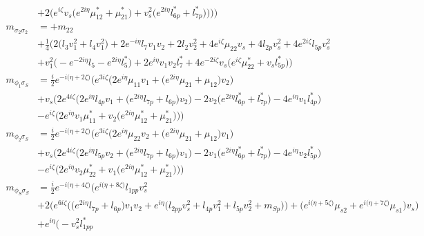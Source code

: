 \begin{itemize}
\begin{align}
 &+2 \Big(e^{i \zeta } v_s \Big(e^{2 i \eta } \mu_{12}^*  + \mu_{21}^*\Big) + v_{s}^{2} \Big(e^{2 i \eta } l_{6p}^*  + l_{7p}^*\Big)\Big)\Big)\Big)\\ 
m_{\sigma_2\sigma_2} &= +m_{22}\nonumber \\ 
 &+\frac{1}{4} \Big(2 \Big(l_3 v_{1}^{2}  + l_4 v_{1}^{2} \Big)+2 e^{-i \eta } l_7 v_1 v_2 +2 l_2 v_{2}^{2} +4 e^{i \zeta } \mu_{22} v_s +4 l_{2p} v_{s}^{2} +4 e^{2 i \zeta } l_{5p} v_{s}^{2} \nonumber \\ 
 &+v_{1}^{2} \Big(- e^{-2 i \eta } l_5  - e^{2 i \eta } l_5^* \Big)+2 e^{i \eta } v_1 v_2 l_7^* +4 e^{-2 i \zeta } v_s \Big(e^{i \zeta } \mu_{22}^*  + v_s l_{5p}^* \Big)\Big)\\ 
m_{\phi_1\sigma_S} &= \frac{i}{2} e^{-i \Big(\eta +2 \zeta \Big)} \Big(e^{3 i \zeta } \Big(2 e^{i \eta } \mu_{11} v_1  + \Big(e^{2 i \eta } \mu_{21}  + \mu_{12}\Big)v_2 \Big)\nonumber \\ 
 &+v_s \Big(2 e^{4 i \zeta } \Big(2 e^{i \eta } l_{4p} v_1  + \Big(e^{2 i \eta } l_{7p}  + l_{6p}\Big)v_2 \Big) -2 v_2 \Big(e^{2 i \eta } l_{6p}^*  + l_{7p}^*\Big) -4 e^{i \eta } v_1 l_{4p}^* \Big)\nonumber \\ 
 &- e^{i \zeta } \Big(2 e^{i \eta } v_1 \mu_{11}^*  + v_2 \Big(e^{2 i \eta } \mu_{12}^*  + \mu_{21}^*\Big)\Big)\Big)\\ 
m_{\phi_2\sigma_S} &= \frac{i}{2} e^{-i \Big(\eta +2 \zeta \Big)} \Big(e^{3 i \zeta } \Big(2 e^{i \eta } \mu_{22} v_2  + \Big(e^{2 i \eta } \mu_{21}  + \mu_{12}\Big)v_1 \Big)\nonumber \\ 
 &+v_s \Big(2 e^{4 i \zeta } \Big(2 e^{i \eta } l_{5p} v_2  + \Big(e^{2 i \eta } l_{7p}  + l_{6p}\Big)v_1 \Big) -2 v_1 \Big(e^{2 i \eta } l_{6p}^*  + l_{7p}^*\Big) -4 e^{i \eta } v_2 l_{5p}^* \Big)\nonumber \\ 
 &- e^{i \zeta } \Big(2 e^{i \eta } v_2 \mu_{22}^*  + v_1 \Big(e^{2 i \eta } \mu_{12}^*  + \mu_{21}^*\Big)\Big)\Big)\\ 
m_{\phi_S\sigma_S} &= \frac{i}{2} e^{-i \Big(\eta +4 \zeta \Big)} \Big(e^{i \Big(\eta +8 \zeta \Big)} l_{1pp} v_{s}^{2} \nonumber \\ 
 &+2 \Big(e^{6 i \zeta } \Big(\Big(e^{2 i \eta } l_{7p}  + l_{6p}\Big)v_1 v_2  + e^{i \eta } \Big(l_{2pp} v_{s}^{2}  + l_{4p} v_{1}^{2}  + l_{5p} v_{2}^{2}  + m_{Sp}\Big)\Big) + \Big(e^{i \Big(\eta +5 \zeta \Big)} \mu_{s2}  + e^{i \Big(\eta +7 \zeta \Big)} \mu_{s1} \Big)v_s \Big)\nonumber \\ 
 &+e^{i \eta } \Big(- v_{s}^{2} l_{1pp}^* \nonumber \\ 

\end{align}
\end{itemize}
